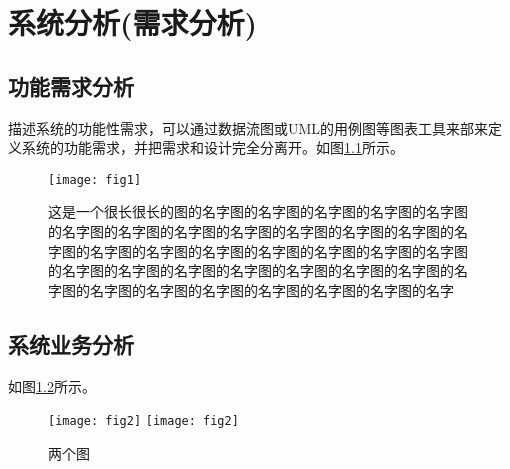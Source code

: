 

\chapter{系统分析(需求分析)}

\section{功能需求分析}
描述系统的功能性需求，可以通过数据流图或UML的用例图等图表工具来部来定义系统的功能需求，并把需求和设计完全分离开。如图\ref{fig:single}所示。




\begin{figure}[H]
	\centering 
	\texttt{[image: fig1]} 
	\caption{这是一个很长很长的图的名字图的名字图的名字图的名字图的名字图的名字图的名字图的名字图的名字图的名字图的名字图的名字图的名字图的名字图的名字图的名字图的名字图的名字图的名字图的名字图的名字图的名字图的名字图的名字图的名字图的名字图的名字图的名字图的名字图的名字图的名字图的名字图的名字图的名字图的名字}
	\label{fig:single}
\end{figure}


\section{系统业务分析}
如图\ref{fig:double}所示。

\begin{figure}[H]
	\centering
    \texttt{[image: fig2]}
    \quad %
    \texttt{[image: fig2]} 
	\caption{两个图}
	\label{fig:double}
\end{figure}

